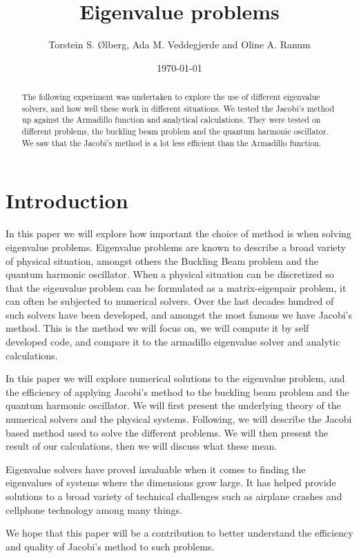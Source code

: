 \documentclass[%
reprint,
amsmath, 
amssymb, 
aps,]{revtex4-1}
\begin{document}
\title{Eigenvalue problems}
\author{Torstein S. Ølberg, Ada M. Veddegjerde and Oline A. Ranum}
\date{\today}


\begin{abstract}
	The following experiment was undertaken to explore the use of different eigenvalue solvers, and how well these work in different situations. We tested the Jacobi's method up against the Armadillo function and analytical calculations. They were tested on different problems, the buckling beam problem and the quantum harmonic oscillator.
	We saw that the Jacobi's method is a lot less efficient than the Armadillo function.
\end{abstract}
\maketitle

	\section*{Introduction}
In this paper we will explore how important the choice of method is when solving eigenvalue problems. Eigenvalue problems are known to describe a broad variety of physical situation, amongst others the Buckling Beam problem and the quantum harmonic oscillator. When a physical situation can be discretized so that the eigenvalue problem can be formulated as a matrix-eigenpair problem, it can often  be subjected to numerical solvers. Over the last decades hundred of such solvers have been developed, and amongst the most famous we have Jacobi’s method. This is the method we will focus on, we will compute it by self developed code, and compare it to the armadillo eigenvalue solver and analytic calculations.
\par In this paper we will explore numerical solutions to the eigenvalue problem, and the efficiency of applying Jacobi’s method to the buckling beam problem and  the quantum harmonic oscillator. We will first present the underlying theory of the numerical solvers and the physical systems. Following, we will describe the Jacobi based method used to solve the different problems. We will then present the result of our calculations, then we will discuss what these mean.
\par Eigenvalue solvers have proved invaluable when it comes to finding the eigenvalues of systems where the dimensions grow large. It has helped provide solutions to a broad variety of technical challenges such as airplane crashes and cellphone technology among many things.
\par We hope that this paper will be a contribution to better understand the efficiency and quality of Jacobi’s method to such problems.
\end{document}
